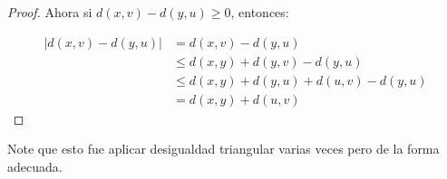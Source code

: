 \begin{itemize}[label={☠},leftmargin=*]
\begin{proof}
Ahora si $d(x,v)-d(y,u)\geq0$, entonces:

\begin{align*}
|d(x,v)-d(y,u)|&=d(x,v)-d(y,u)\\
&\leq d(x,y)+d(y,v)-d(y,u)\\
&\leq d(x,y)+d(y,u)+d(u,v)-d(y,u)\\
&=d(x,y)+d(u,v)
\end{align*}
\end{proof}

\begin{note}
Note que esto fue aplicar desigualdad triangular varias veces pero de la forma adecuada.
\end{note}

\end{itemize}




